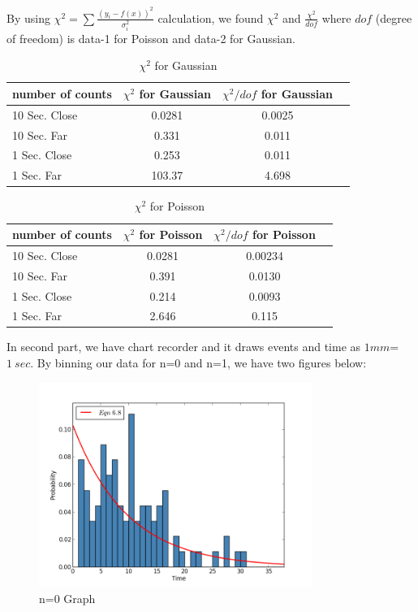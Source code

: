 \documentclass[aps,twocolumn,secnumarabic,nobalancelastpage,amsmath,amssymb,
nofootinbib]{revtex4}
\begin{document}
By using ${\chi}^{2}=\sum{\frac{{({y}_{i}-f(x))}^{2}}{{\sigma}_{i}^2}}$ calculation, we found $\chi^2$ and $\frac{\chi^2}{dof}$ where $dof$ (degree of freedom) is data-1 for Poisson and data-2 for Gaussian.

\begin{center}
\begin{table}[htbp]
\begin{tabular}{|l|c|c|r|}
\hline
{\small number of counts} & {\small $\chi^2$ for Gaussian} & {\small $\chi^2/dof$ for Gaussian }  \\
\hline
10 Sec. Close 	&  0.0281  	& 0.0025  \\
10 Sec. Far 	&  0.331   	& 0.011  \\
1  Sec. Close 	&  0.253  	& 0.011  \\
1  Sec. Far	 	&  103.37 	& 4.698  \\
\hline
\end{tabular}
\caption{\label{tab:linfitresults} $\chi^2$ for Gaussian}
\end{table}
\end{center}

\begin{center}
\begin{table}[htbp]
\begin{tabular}{|l|c|c|r|}
\hline
{\small number of counts} & {\small $\chi^2$ for Poisson} & {\small $\chi^2/dof$ for Poisson}  \\
\hline
10 Sec. Close 	&  0.0281  	& 0.00234  \\
10 Sec. Far 	&  0.391   	& 0.0130  \\
1  Sec. Close 	&  0.214  	& 0.0093  \\
1  Sec. Far	 	&  2.646 	& 0.115  \\
\hline
\end{tabular}
\caption{\label{tab:linfitresults} $\chi^2$ for Poisson}
\end{table}
\end{center}

In second part, we have chart recorder and it draws events and time as $1mm$=$1\ sec.$ By binning our data for n=0 and n=1, we have two figures below:

\begin{figure}[htbp]
\includegraphics[width=3.5in]{n0}
\caption{n=0 Graph}
\end{figure}
\end{document}
